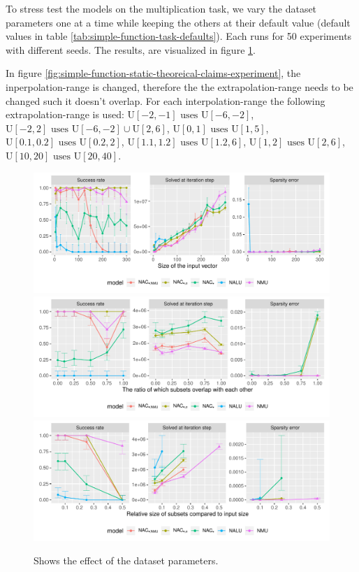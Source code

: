 To stress test the models on the multiplication task, we vary the dataset parameters one at a time while keeping the others at their default value (default values in table \ref{tab:simple-function-task-defaults}). Each runs for 50 experiments with different seeds. The results, are visualized in figure \ref{fig:simple-function-static-dataset-parameters-boundary}.

In figure \ref{fig:simple-function-static-theoreical-claims-experiment}, the inperpolation-range is changed, therefore the the extrapolation-range needs to be changed such it doesn't overlap. For each interpolation-range the following extrapolation-range is used: ${\mathrm{U}[-2,-1] \text{ uses } \mathrm{U}[-6,-2]}$, ${\mathrm{U}[-2,2] \text{ uses } \mathrm{U}[-6,-2] \cup \mathrm{U}[2,6]}$, ${\mathrm{U}[0,1] \text{ uses } \mathrm{U}[1,5]}$, ${\mathrm{U}[0.1,0.2] \text{ uses } \mathrm{U}[0.2,2]}$, ${\mathrm{U}[1.1,1.2] \text{ uses } \mathrm{U}[1.2,6]}$, ${\mathrm{U}[1,2] \text{ uses } \mathrm{U}[2,6]}$, ${\mathrm{U}[10, 20] \text{ uses } \mathrm{U}[20, 40]}$.

\begin{figure}[h]
\centering
\includegraphics[width=\linewidth,trim={0 1.3cm 0 0},clip]{results/simple_function_static_mul_input_size.pdf}
\includegraphics[width=\linewidth,trim={0 1.3cm 0 0.809cm},clip]{results/simple_function_static_mul_overlap.pdf}
\includegraphics[width=\linewidth,trim={0 0 0 0.809cm},clip]{results/simple_function_static_mul_subset.pdf}
\caption{Shows the effect of the dataset parameters.}
\label{fig:simple-function-static-dataset-parameters-boundary}
\end{figure}

